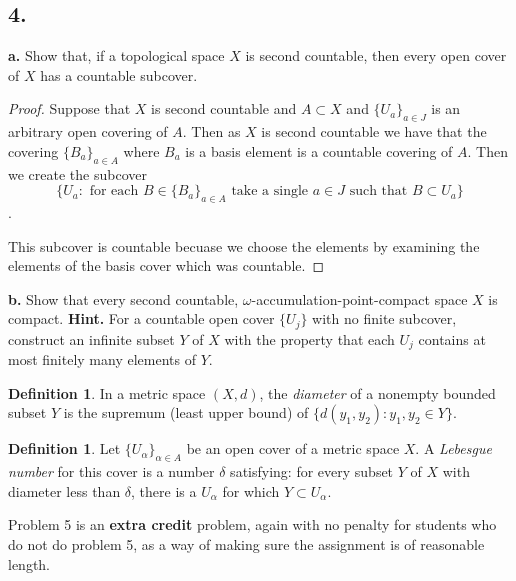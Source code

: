 \documentclass{amsart}
\theoremstyle{plain}
\theoremstyle{definition}
\newtheorem{definition}[theorem]{Definition}
\theoremstyle{remark}
\begin{document}
\vspace{.15in}
\noindent
\subsection*{4.} 

\noindent
{\bfseries a.} Show that, if a topological space $X$ is second countable, then every open cover of $X$ has a countable subcover.

\begin{proof}
   Suppose that $X$ is second countable and $A\subset X$ and $\{U_a\}_{a\in J}$ is an arbitrary open covering of $A$. Then as $X$ is second countable we have that the covering $\{B_a\}_{a\in A}$ where $B_a$ is a basis element is a countable covering of $A$. Then we create the subcover \[\{U_a: \text{ for each }B\in  \{B_a\}_{a\in A}  \text{ take a single } a\in J \text{ such that } B\subset U_a\}\]. 

   This subcover is countable becuase we choose the elements by examining the elements of the basis cover which was countable. 




\end{proof}

\vspace{.1in}
\noindent
{\bfseries b.} Show that every second countable, $\omega$-accumulation-point-compact space $X$ is compact. {\bfseries Hint.} For a countable open cover $\{ U_j\}$ with no finite subcover, construct an infinite subset $Y$ of $X$ with the property that each $U_j$ contains at most finitely many elements of $Y$. 

\vspace{.15in}
\begin{definition} In a metric space $(X,d)$, the {\it diameter} of a nonempty bounded subset $Y$ is the supremum (least upper bound) of $\{ d(y_1, y_2) : y_1, y_2 \in Y\}$. \end{definition}

\vspace{.15in}
\begin{definition} Let $\{ U_{\alpha}\} _{\alpha \in A}$ be an open cover of a metric space $X$. A {\it Lebesgue number} for this cover is a number $\delta$ satisfying: for every subset $Y$ of $X$ with diameter less than $\delta$, there is a $U_{\alpha}$ for which $Y\subset U_{\alpha}$. \end{definition}

\vspace{.15in}
Problem 5 is an {\bf extra credit} problem, again with no penalty for students who do not do problem 5, as a way of making sure the assignment is of reasonable length.
 
\end{document}
